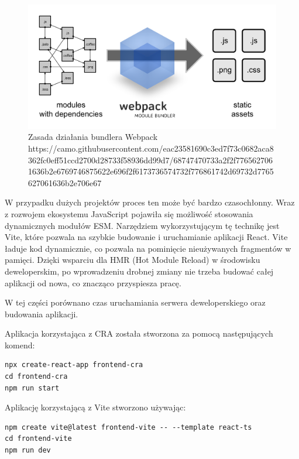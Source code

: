 \documentclass{article}
\begin{document}
\begin{figure}[H]
    \centering
    \includegraphics[width=\textwidth]{webpack.png}
    \caption{Zasada działania bundlera Webpack https://camo.githubusercontent.com/eac23581690c3ed7f73c0682aca8362fc0eff51ccd2700d28733f58936dd99d7/68747470733a2f2f7765627061636b2e6769746875622e696f2f6173736574732f776861742d69732d7765627061636b2e706e67}
    \label{fig:ast}
\end{figure}

W przypadku dużych projektów proces ten może być bardzo czasochłonny. Wraz z rozwojem ekosystemu JavaScript pojawiła się możliwość stosowania dynamicznych modułów ESM. Narzędziem wykorzystującym tę technikę jest Vite, które pozwala na szybkie budowanie i uruchamianie aplikacji React\cite{ViteSite}. Vite ładuje kod dynamicznie, co pozwala na pominięcie nieużywanych fragmentów w pamięci. Dzięki wsparciu dla HMR (Hot Module Reload) w środowisku deweloperskim, po wprowadzeniu drobnej zmiany nie trzeba budować całej aplikacji od nowa, co znacząco przyspiesza pracę.

W tej części porównano czas uruchamiania serwera deweloperskiego oraz budowania aplikacji.

Aplikacja korzystająca z CRA została stworzona za pomocą następujących komend:

\begin{lstlisting}[caption=Stworzenie i włączenie aplikacji React (CRA)]
npx create-react-app frontend-cra
cd frontend-cra
npm run start
\end{lstlisting}

Aplikację korzystającą z Vite stworzono używając: 

\begin{lstlisting}[caption=Stworzenie i włączenie aplikacji React (CRA)]
npm create vite@latest frontend-vite -- --template react-ts
cd frontend-vite
npm run dev
\end{lstlisting}
\end{document}

